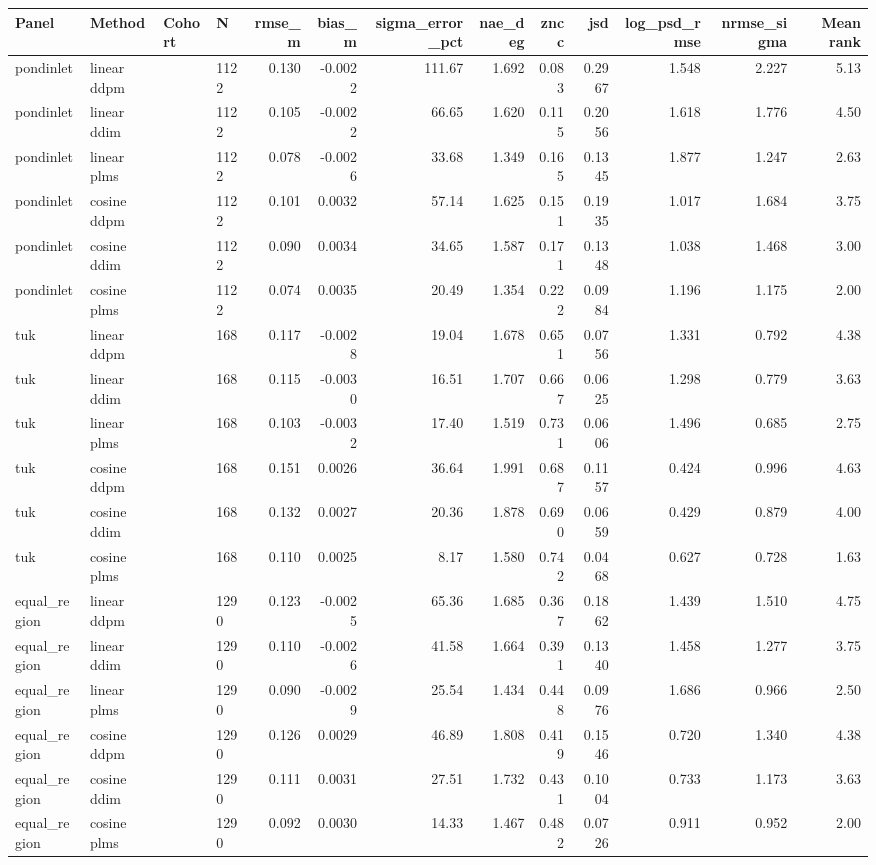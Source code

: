 \begin{tabular}{llllrrrrrrrrr}
\hline
Panel & Method & Cohort & N & rmse\_m & bias\_m & sigma\_error\_pct & nae\_deg & zncc & jsd & log\_psd\_rmse & nrmse\_sigma & Mean rank \\
\hline
pondinlet & linear ddpm &  & 1122 & 0.130 & -0.0022 & 111.67 & 1.692 & 0.083 & 0.2967 & 1.548 & 2.227 & 5.13 \\
pondinlet & linear ddim &  & 1122 & 0.105 & -0.0022 & 66.65 & 1.620 & 0.115 & 0.2056 & 1.618 & 1.776 & 4.50 \\
pondinlet & linear plms &  & 1122 & 0.078 & -0.0026 & 33.68 & 1.349 & 0.165 & 0.1345 & 1.877 & 1.247 & 2.63 \\
pondinlet & cosine ddpm &  & 1122 & 0.101 & 0.0032 & 57.14 & 1.625 & 0.151 & 0.1935 & 1.017 & 1.684 & 3.75 \\
pondinlet & cosine ddim &  & 1122 & 0.090 & 0.0034 & 34.65 & 1.587 & 0.171 & 0.1348 & 1.038 & 1.468 & 3.00 \\
pondinlet & cosine plms &  & 1122 & 0.074 & 0.0035 & 20.49 & 1.354 & 0.222 & 0.0984 & 1.196 & 1.175 & 2.00 \\
tuk & linear ddpm &  & 168 & 0.117 & -0.0028 & 19.04 & 1.678 & 0.651 & 0.0756 & 1.331 & 0.792 & 4.38 \\
tuk & linear ddim &  & 168 & 0.115 & -0.0030 & 16.51 & 1.707 & 0.667 & 0.0625 & 1.298 & 0.779 & 3.63 \\
tuk & linear plms &  & 168 & 0.103 & -0.0032 & 17.40 & 1.519 & 0.731 & 0.0606 & 1.496 & 0.685 & 2.75 \\
tuk & cosine ddpm &  & 168 & 0.151 & 0.0026 & 36.64 & 1.991 & 0.687 & 0.1157 & 0.424 & 0.996 & 4.63 \\
tuk & cosine ddim &  & 168 & 0.132 & 0.0027 & 20.36 & 1.878 & 0.690 & 0.0659 & 0.429 & 0.879 & 4.00 \\
tuk & cosine plms &  & 168 & 0.110 & 0.0025 & 8.17 & 1.580 & 0.742 & 0.0468 & 0.627 & 0.728 & 1.63 \\
equal\_region & linear ddpm &  & 1290 & 0.123 & -0.0025 & 65.36 & 1.685 & 0.367 & 0.1862 & 1.439 & 1.510 & 4.75 \\
equal\_region & linear ddim &  & 1290 & 0.110 & -0.0026 & 41.58 & 1.664 & 0.391 & 0.1340 & 1.458 & 1.277 & 3.75 \\
equal\_region & linear plms &  & 1290 & 0.090 & -0.0029 & 25.54 & 1.434 & 0.448 & 0.0976 & 1.686 & 0.966 & 2.50 \\
equal\_region & cosine ddpm &  & 1290 & 0.126 & 0.0029 & 46.89 & 1.808 & 0.419 & 0.1546 & 0.720 & 1.340 & 4.38 \\
equal\_region & cosine ddim &  & 1290 & 0.111 & 0.0031 & 27.51 & 1.732 & 0.431 & 0.1004 & 0.733 & 1.173 & 3.63 \\
equal\_region & cosine plms &  & 1290 & 0.092 & 0.0030 & 14.33 & 1.467 & 0.482 & 0.0726 & 0.911 & 0.952 & 2.00 \\
\hline
\end{tabular}
